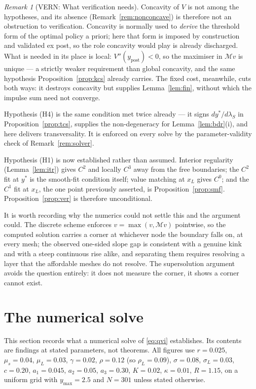 \documentclass[11pt]{article}
\theoremstyle{remark}
\newtheorem{remark}{Remark}
\begin{document}
\begin{remark}[VERN: What verification needs]
\label{rem:vern}
Concavity of $V$ is not among the hypotheses, and its absence
(Remark~\ref{rem:nonconcave}) is therefore not an obstruction to
verification. Concavity is normally used to \emph{derive} the
threshold form of the optimal policy a priori; here that form is imposed
by construction and validated ex post, so the role concavity would play is
already discharged. What is needed in its place is local: $V''(y_{\mathrm{post}})<0$,
so the maximiser in $\mathcal{M}v$ is unique --- a strictly weaker
requirement than global concavity, and the same hypothesis
Proposition~\ref{prop:kcs} already carries. The fixed cost, meanwhile,
cuts both ways: it destroys concavity but supplies
Lemma~\ref{lem:fin}, without which the impulse sum need not converge.

Hypothesis (H4) is the same condition met twice already --- it signs
$dy^*/d\lambda_S$ in Proposition~\ref{prop:tcs}, supplies the
non-degeneracy for Lemma~\ref{lem:bdr}(i), and here delivers
transversality. It is enforced on every solve by the parameter-validity
check of Remark~\ref{rem:solver}.

Hypothesis (H1) is now established rather than assumed. Interior
regularity (Lemma~\ref{lem:itr}) gives $C^2$ and locally $C^3$ away from
the free boundaries; the $C^2$ fit at $y^*$ is the smooth-fit condition
itself; value matching at $x_L$ gives $C^0$; and the $C^1$ fit at $x_L$,
the one point previously asserted, is Proposition~\ref{prop:smf}.
Proposition~\ref{prop:ver} is therefore unconditional.

It is worth recording why the numerics could not settle this and the
argument could. The discrete scheme enforces $v=\max(v,\mathcal{M}v)$
pointwise, so the computed solution carries a corner at whichever node the
boundary falls on, at every mesh; the observed one-sided slope gap is
consistent with a genuine kink and with a steep continuous rise alike, and
separating them requires resolving a layer that the affordable meshes do
not resolve. The supersolution argument avoids the question entirely: it
does not measure the corner, it shows a corner cannot exist.
\end{remark}

\section{The numerical solve}
\label{sec:numerical}

This section records what a numerical solve of \eqref{eq:qvi}
establishes. Its contents are findings at stated parameters, not
theorems. All figures use $r=0.025$, $\mu_s=0.04$, $\mu_L=0.03$,
$\gamma=0.02$, $\rho=0.12$ (so $\rho_L=0.09$), $\sigma=0.08$,
$\sigma_L=0.03$, $c=0.20$,
$a_1=0.045$, $a_2=0.05$, $a_3=0.30$, $K=0.02$, $\kappa=0.01$, $R=1.15$,
on a uniform grid with $y_{\max}=2.5$ and $N=301$ unless stated otherwise.
\end{document}
